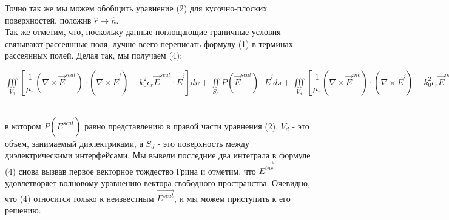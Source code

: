 Точно так же мы можем обобщить уравнение (2) для кусочно-плоских поверхностей, положив $ \hat{r} \rightarrow \hat{n} $.\\
Так же отметим, что, поскольку данные поглощающие граничные условия связывают рассеянные поля, лучше всего переписать формулу (1) в терминах рассеянных полей. Делая так, мы получаем (4): \\
\begin{center}
	$ \iiint\limits_{V_{0}}^{} \left[ \dfrac{1}{\mu_{r}}(\nabla \times \vec{E}^{scat}) \cdot (\nabla \times \vec{E^{'}}) - k_{0}^{2} \epsilon_{r}\vec{E}^{scat} \cdot \vec{E^{'}} \right]d\upsilon + 
	\iint\limits_{S_{0}}^{}  P(\vec{E}^{scat}) \cdot \vec{E^{'}}ds + 
	\iiint\limits_{V_{d}}^{} \left[ \dfrac{1}{\mu_{r}}(\nabla \times \vec{E}^{inc}) \cdot (\nabla \times \vec{E^{'}}) - k_{0}^{2} \epsilon_{r}\vec{E}^{inc} \cdot \vec{E^{'}} \right]d\upsilon + 
	jk_{0}Z_{0}\iint\limits_{S_{d}}^{} \dfrac{1}{\mu_{r}}(\hat{n} \times \vec{H}^{inc}) \cdot \vec{E^{'}}ds = 0, $
\end{center}\\
в котором $P(\vec{E^{scat}})$ равно представлению в правой части уравнения (2), $ V_{d} $ - это объем, занимаемый диэлектриками, а $ S_{d} $ - это поверхность между диэлектрическими интерфейсами. Мы вывели последние два интеграла в формуле (4) снова вызвав первое векторное тождество Грина и отметим, что $ \vec{E^{inc}} $ удовлетворяет волновому уравнению вектора свободного пространства. Очевидно, что (4) относится только к неизвестным $ \vec{E^{scat}} $, и мы можем приступить к его решению.
